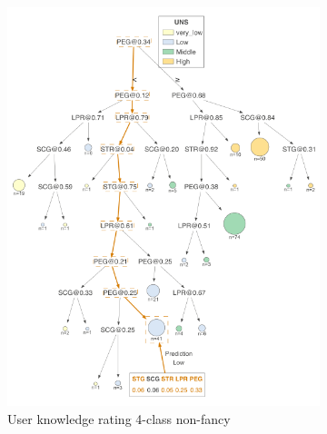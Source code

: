 \begin{figure}[p]
    \begin{subfigure}{0.48\textwidth}
        \includegraphics[width=\linewidth]{images/knowledge-TD-15-X-simple.png}
        \caption{User knowledge rating 4-class non-fancy}
        \label{fig:tool_comparison_knowledge-TD-15-X-simple}
    \end{subfigure}\hfill
    \begin{subfigure}{0.48\textwidth}

\end{subfigure}
\end{figure}
